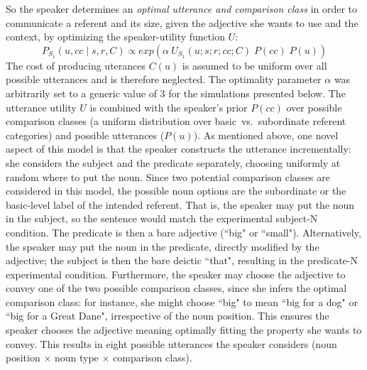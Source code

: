 So the speaker determines an \emph{optimal utterance and comparison class} in order to communicate a referent and its size, given the adjective she wants to use and the context, by optimizing the speaker-utility function $U$:
\begin{equation}
P_{S_1} (u, cc \mid s, r, C)  \propto exp(\alpha \: U_{S_1}(u; s; r; cc; C) \; P(cc) \; P(u)) 
\end{equation}
The cost of producing uterances $C(u)$ is assumed to be uniform over all possible utterances and is therefore neglected. The optimality parameter $\alpha$ was arbitrarily set to a generic value of 3 for the simulations presented below. The utterance utility $U$ is combined with the speaker's prior $P(cc)$ over possible comparison classes (a uniform distribution over basic~vs.~subordinate referent categories) and possible utterances ($P(u)$).
As mentioned above, one novel aspect of this model is that the speaker constructs the utterance incrementally: she considers the subject and the predicate separately, choosing uniformly at random where to put the noun. Since two potential comparison classes are considered in this model, the possible noun options are the subordinate or the basic-level label of the intended referent. That is, the speaker may put the noun in the subject, so the sentence would match the experimental subject-N condition. The predicate is then a bare adjective (``big" or ``small"). Alternatively, the speaker may put the noun in the predicate, directly modified by the adjective; the subject is then the bare deictic ``that", resulting in the predicate-N experimental condition. Furthermore, the speaker may choose the adjective to convey one of the two possible comparison classes, since she infers the optimal comparison class: for instance, she might choose ``big" to mean ``big for a dog" or ``big for a Great Dane", irrespective of the noun position. This ensures the speaker chooses the adjective meaning optimally fitting the property she wants to convey. This results in eight possible utterances the speaker considers (noun position $\times$ noun type $\times$ comparison class).  

